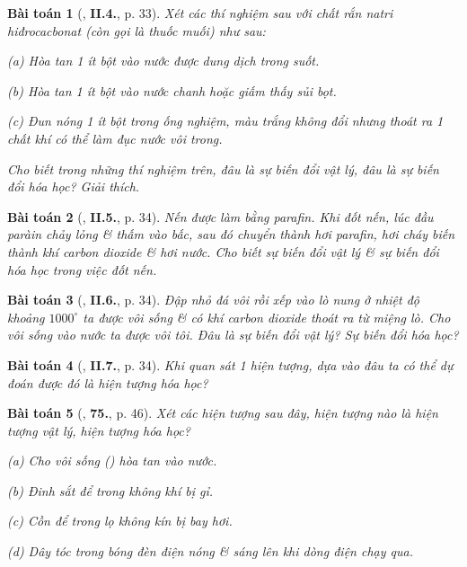 \documentclass{article}
\numberwithin{equation}{section}
\newtheorem{baitoan}{Bài toán}
\begin{document}
\begin{baitoan}[\cite{Truong_BTNC_Hoa_Hoc_8_2022}, \textbf{II.4.}, p. 33]
	Xét các thí nghiệm sau với chất rắn natri hiđrocacbonat \emph{} (còn gọi là \emph{thuốc muối}) như sau:
	\begin{enumerate*}
		\item[(a)] Hòa tan 1 ít bột \emph{} vào nước được dung dịch trong suốt.
		\item[(b)] Hòa tan 1 ít bột \emph{} vào nước chanh hoặc giấm thấy sủi bọt.
		\item[(c)] Đun nóng 1 ít bột \emph{} trong ống nghiệm, màu trắng không đổi nhưng thoát ra 1 chất khí có thể làm đục nước vôi trong.
	\end{enumerate*}
	Cho biết trong những thí nghiệm trên, đâu là sự biến đổi vật lý, đâu là sự biến đổi hóa học? Giải thích.
\end{baitoan}

\begin{baitoan}[\cite{Truong_BTNC_Hoa_Hoc_8_2022}, \textbf{II.5.}, p. 34]
	Nến được làm bằng parafin. Khi đốt nến, lúc đầu paràin chảy lỏng \& thấm vào bấc, sau đó chuyển thành hơi parafin, hơi cháy biến thành khí carbon dioxide \& hơi nước. Cho biết sự biến đổi vật lý \& sự biến đổi hóa học trong việc đốt nến.
\end{baitoan}

\begin{baitoan}[\cite{Truong_BTNC_Hoa_Hoc_8_2022}, \textbf{II.6.}, p. 34]
	Đập nhỏ đá vôi rồi xếp vào lò nung ở nhiệt độ khoảng $1000^\circ$ ta được vôi sống \& có khí carbon dioxide thoát ra từ miệng lò. Cho vôi sống vào nước ta được vôi tôi. Đâu là sự biến đổi vật lý? Sự biến đổi hóa học?
\end{baitoan}

\begin{baitoan}[\cite{Truong_BTNC_Hoa_Hoc_8_2022}, \textbf{II.7.}, p. 34]
	Khi quan sát 1 hiện tượng, dựa vào đâu ta có thể dự đoán được đó là hiện tượng hóa học?
\end{baitoan}

\begin{baitoan}[\cite{An_400_BT_Hoa_Hoc_8_2020}, \textbf{75.}, p. 46]
	Xét các hiện tượng sau đây, hiện tượng nào là hiện tượng vật lý, hiện tượng hóa học?
	\begin{enumerate*}
		\item[(a)] Cho vôi sống () hòa tan vào nước.
		\item[(b)] Đinh sắt để trong không khí bị gỉ.
		\item[(c)] Cồn để trong lọ không kín bị bay hơi.
		\item[(d)] Dây tóc trong bóng đèn điện nóng \& sáng lên khi dòng điện chạy qua.
	\end{enumerate*}
\end{baitoan}
\end{document}
